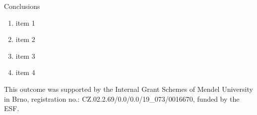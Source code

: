 \documentclass[final]{beamer}
\newlength{\sepwidth}
\newcommand{\separatorcolumn}{\begin{column}{\sepwidth}\end{column}}
\begin{document}
\begin{frame}[t]
\begin{columns}[c]
\begin{column}{0.96\paperwidth}
\begin{block}{Conclusions}
    \begin{enumerate}
        \item item 1
        \item item 2
        \item item 3
        \item item 4
    \end{enumerate}
\end{block}
\small \centering This outcome was supported by the Internal Grant Schemes of Mendel University in Brno, registration no.: CZ.02.2.69/0.0/0.0/19\_073/0016670, funded by the ESF.
\end{column}
%
%
\end{columns}
\end{frame}
\end{document}
